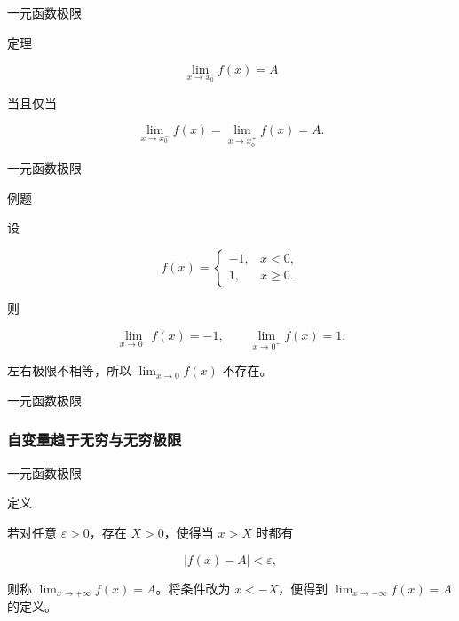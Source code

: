 \documentclass[aspectratio=169,10pt,fontset=fandol]{ctexbeamer}
\begin{document}
\begin{frame}[t,fragile]{一元函数极限}
\normalsize
\begin{block}{定理}
{\normalsize


\[

\lim_{x\to x_0}f(x)=A

\]

当且仅当

\[

\lim_{x\to x_0^-}f(x)=\lim_{x\to x_0^+}f(x)=A.

\]


}
\end{block}
\end{frame}
\begin{frame}[t,fragile]{一元函数极限}
\normalsize
\begin{block}{例题}
{\normalsize


设

\[

f(x)=

\begin{cases}

-1,&x<0,\\

1,&x\geq0.

\end{cases}

\]

则

\[

\lim_{x\to0^-}f(x)=-1,\qquad

\lim_{x\to0^+}f(x)=1.

\]

左右极限不相等，所以 \(\lim_{x\to0}f(x)\) 不存在。


}
\end{block}
\end{frame}
\begin{frame}[t,fragile]{一元函数极限}
\normalsize
{\normalsize




\subsubsection*{自变量趋于无穷与无穷极限}




}
\end{frame}
\begin{frame}[t,fragile]{一元函数极限}
\normalsize
\begin{block}{定义}
{\normalsize


若对任意 \(\varepsilon>0\)，存在 \(X>0\)，使得当 \(x>X\) 时都有

\[

|f(x)-A|<\varepsilon,

\]

则称 \(\lim_{x\to+\infty}f(x)=A\)。将条件改为 \(x<-X\)，便得到 \(\lim_{x\to-\infty}f(x)=A\) 的定义。


}
\end{block}
\end{frame}
\end{document}
